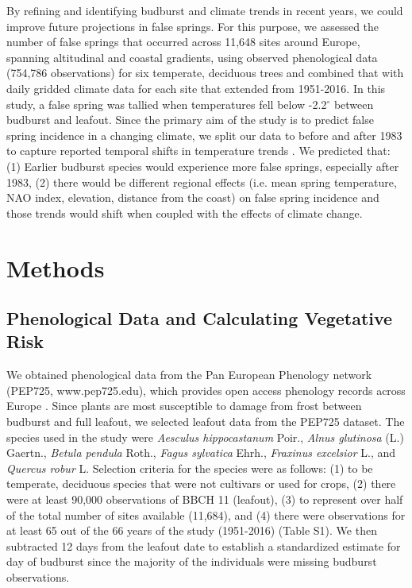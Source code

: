 \documentclass{article}\usepackage[]{graphicx}\usepackage[]{color}
\begin{document}
By refining and identifying budburst and climate trends in recent years, we could improve future projections in false springs. For this purpose, we assessed the number of false springs that occurred across 11,648 sites around Europe, spanning altitudinal and coastal gradients, using observed phenological data (754,786 observations) for six temperate, deciduous trees and combined that with daily gridded climate data for each site that extended from 1951-2016. In this study, a false spring was tallied when temperatures fell below -2.2$^{\circ}$ \citep{Schwartz1993} between budburst and leafout. Since the primary aim of the study is to predict false spring incidence in a changing climate, we split our data to before and after 1983 to capture reported temporal shifts in temperature trends \citep{Kharouba2018, Stocker2013}. We predicted that: (1) Earlier budburst species would experience more false springs, especially after 1983, (2) there would be different regional effects (i.e. mean spring temperature, NAO index, elevation, distance from the coast) on false spring incidence and those trends would shift when coupled with the effects of climate change. 


\section*{Methods}
\subsection*{Phenological Data and Calculating Vegetative Risk}
We obtained phenological data from the Pan European Phenology network (PEP725, www.pep725.edu), which provides open access phenology records across Europe \citep{Templ2018}. Since plants are most susceptible to damage from frost between budburst and full leafout, we selected leafout data \citep[i.e., in][BBCH 11, which is defined as the point of leaf unfolding and the first visible leaf stalk]{Meier2001} from the PEP725 dataset. The species used in the study were \textit{Aesculus hippocastanum} Poir., \textit{Alnus glutinosa} (L.) Gaertn., \textit{Betula pendula} Roth., \textit{Fagus sylvatica} Ehrh., \textit{Fraxinus excelsior} L., and \textit{Quercus robur} L. Selection criteria for the species were as follows: (1) to be temperate, deciduous species that were not cultivars or used for crops, (2) there were at least 90,000 observations of BBCH 11 (leafout), (3) to represent over half of the total number of sites available (11,684), and (4) there were observations for at least 65 out of the 66 years of the study (1951-2016) (Table S1). We then subtracted 12 days from the leafout date to establish a standardized estimate for day of budburst \citep{Donnelly2017} since the majority of the individuals were missing budburst observations.
\end{document}

